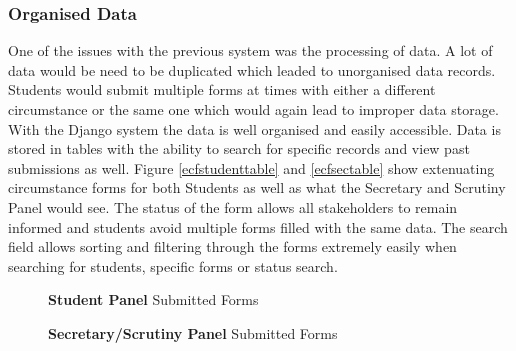 \documentclass[../main.tex]{subfiles}
\begin{document}
      
\subsubsection{Organised Data}
One of the issues with the previous system was the processing of data. A lot of data would be need to be duplicated which leaded to unorganised data records. Students would submit multiple forms at times with either a different circumstance or the same one which would again lead to improper data storage. With the Django system the data is well organised and easily accessible. Data is stored in tables with the ability to search for specific records and view past submissions as well.  Figure \ref{ecfstudenttable} and \ref{ecfsectable} show extenuating circumstance forms for both Students as well as what the Secretary and Scrutiny Panel would see. The status of the form allows all stakeholders to remain informed and students avoid multiple forms filled with the same data. The search field allows sorting and filtering through the forms extremely easily when searching for students, specific forms or status search. 

\begin{figure}[H]
        \caption{\label{fig:ecfstudenttable} \textbf{Student Panel} Submitted Forms}
      \end{figure}
 
\begin{figure}[H]
        \caption{\label{fig:ecfsectable} \textbf{Secretary/Scrutiny Panel} Submitted Forms}
      \end{figure}
\end{document}
